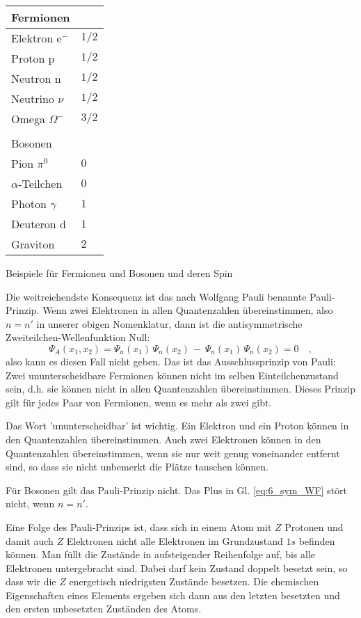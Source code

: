 \begin{marginfigure}
    \begin{tabular}{ll}
        Fermionen & \\
        \hline
        Elektron e$^-$ & $1/2$ \\
        Proton p & $1/2$ \\
        Neutron n & $1/2$ \\
        Neutrino $\nu$ & $1/2$ \\
        Omega $\Omega^-$ & $3/2$ \\
    & \\
    Bosonen & \\
    \hline
    Pion $\pi^0$ & $0$ \\
    $\alpha$-Teilchen & $0$ \\
   Photon $\gamma$ & $1$ \\
   Deuteron d & $1$ \\
    Graviton & $2$ \\
    \end{tabular}
    \caption{Beispiele für  Fermionen und Bosonen und deren Spin}
    \label{tab:6_bosonen_fermionen}
\end{marginfigure}

Die weitreichendste Konsequenz ist das nach Wolfgang Pauli benannte Pauli-Prinzip. Wenn zwei Elektronen in allen Quantenzahlen übereinstimmen, also $n = n'$ in unserer obigen Nomenklatur, dann ist die antisymmetrische Zweiteilchen-Wellenfunktion Null:
\begin{equation}
    \Psi_A(x_1, x_2) =  \Psi_{n}(x_1) \, \Psi_{n}(x_2) \, - \, \Psi_{n}(x_1) \, \Psi_{n}(x_2) = 0 \quad ,
\end{equation}
also kann  es diesen Fall  nicht geben. Das ist das Ausschlussprinzip von Pauli: Zwei ununterscheidbare Fermionen können nicht im selben Einteilchenzustand sein, d.h. sie können nicht in allen Quantenzahlen übereinstimmen. Dieses Prinzip gilt für jedes Paar von Fermionen, wenn es mehr als zwei gibt.

Das Wort 'ununterscheidbar' ist wichtig. Ein Elektron und ein Proton können in den Quantenzahlen übereinstimmen. Auch zwei Elektronen können in den Quantenzahlen übereinstimmen, wenn sie nur weit genug voneinander entfernt sind, so dass sie nicht unbemerkt die Plätze tauschen können. 

Für Bosonen gilt das Pauli-Prinzip nicht. Das Plus in Gl. \ref{eq:6_sym_WF} stört nicht, wenn $n = n'$.

Eine Folge des Pauli-Prinzips ist, dass sich in einem Atom mit $Z$ Protonen und damit auch $Z$ Elektronen nicht alle Elektronen im Grundzustand $1s$ befinden können. Man füllt die Zustände in aufsteigender Reihenfolge auf, bis alle Elektronen untergebracht sind. Dabei darf kein Zustand doppelt besetzt sein, so dass wir die $Z$ energetisch niedrigsten Zustände besetzen. Die chemischen Eigenschaften eines Elements ergeben sich dann aus den letzten besetzten und den ersten unbesetzten Zuständen des Atoms.


